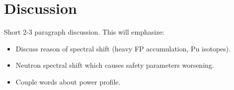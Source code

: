 \section{Discussion}
Short 2-3 paragraph discussion. This will emphasize:
\begin{itemize}
  \item Discuss reason of spectral shift (heavy \gls{FP} accumulation, Pu isotopes).
  \item Neutron spectral shift which causes safety parameters worsening.  
  \item Couple words about power profile.
\end{itemize}
